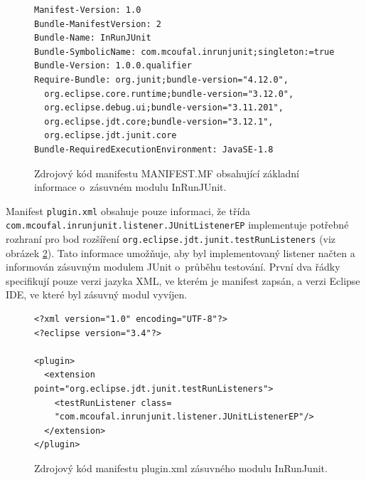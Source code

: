	\lstset{language=}
	\begin{figure}[h]
	  \begin{lstlisting}[frame=single]
Manifest-Version: 1.0
Bundle-ManifestVersion: 2
Bundle-Name: InRunJUnit
Bundle-SymbolicName: com.mcoufal.inrunjunit;singleton:=true
Bundle-Version: 1.0.0.qualifier
Require-Bundle: org.junit;bundle-version="4.12.0",
  org.eclipse.core.runtime;bundle-version="3.12.0",
  org.eclipse.debug.ui;bundle-version="3.11.201",
  org.eclipse.jdt.core;bundle-version="3.12.1",
  org.eclipse.jdt.junit.core
Bundle-RequiredExecutionEnvironment: JavaSE-1.8
	  \end{lstlisting}
	  \caption{Zdrojový kód manifestu MANIFEST.MF obsahující základní informace o~zásuvném modulu InRunJUnit.}
	  \label{code:manifest.mf}
	\end{figure}
	
	Manifest \texttt{plugin.xml} obsahuje pouze informaci, že třída \texttt{com.\-mcoufal.\-inrunjunit.\-listener.\-JUnitListenerEP} implementuje potřebné rozhraní pro bod rozšíření \texttt{org.\-eclipse.\-jdt.\-junit.\-testRunListeners} (viz obrázek \ref{code:plugin.xml}). Tato informace umožňuje, aby byl implementovaný listener načten a informován zásuvným modulem JUnit o~průběhu testování. První dva řádky specifikují pouze verzi jazyka XML, ve kterém je manifest zapsán, a verzi Eclipse IDE, ve které byl zásuvný modul vyvíjen.

	\lstset{language=xml}
	\begin{figure}[h]
	  \begin{lstlisting}[frame=single]
<?xml version="1.0" encoding="UTF-8"?>
<?eclipse version="3.4"?>

<plugin>
  <extension point="org.eclipse.jdt.junit.testRunListeners">
    <testRunListener class=
    "com.mcoufal.inrunjunit.listener.JUnitListenerEP"/>
  </extension>
</plugin>
	  \end{lstlisting}
	  \caption{Zdrojový kód manifestu plugin.xml zásuvného modulu InRunJunit.}
	  \label{code:plugin.xml}
	\end{figure}

